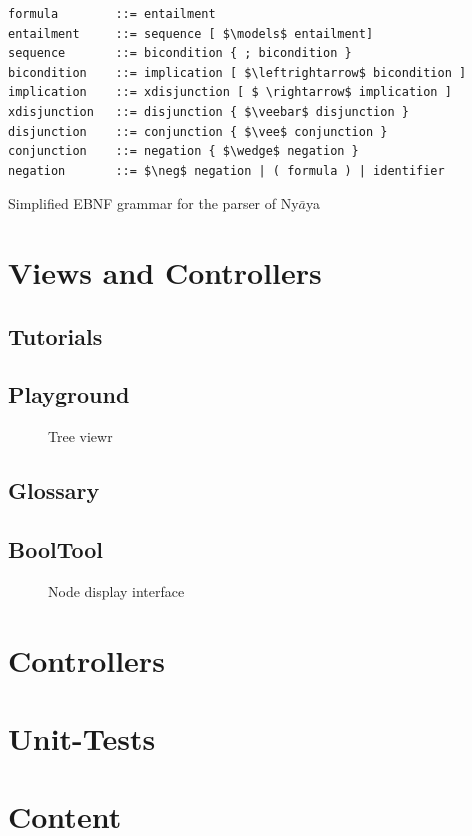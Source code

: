 \begin{table}[htdp]
\begin{center}
\begin{lstlisting}[mathescape]
formula        ::= entailment
entailment     ::= sequence [ $\models$ entailment]
sequence       ::= bicondition { ; bicondition } 
bicondition    ::= implication [ $\leftrightarrow$ bicondition ]
implication    ::= xdisjunction [ $ \rightarrow$ implication ]
xdisjunction   ::= disjunction { $\veebar$ disjunction }
disjunction    ::= conjunction { $\vee$ conjunction }
conjunction    ::= negation { $\wedge$ negation }
negation       ::= $\neg$ negation | ( formula ) | identifier
\end{lstlisting}
\caption{Simplified EBNF grammar for the parser of Ny$\bar{a}$ya}
\label{tab:EBNF}
\end{center}
\end{table}


\section{Views and Controllers}

\subsection{Tutorials}

\subsection{Playground}

\begin{figure}[htbp]
\begin{center}
\caption{Tree viewr}
\label{fig:TreeView}
\end{center}
\end{figure}

\subsection{Glossary}

\subsection{BoolTool}




\begin{figure}[htbp]
\begin{center}
\caption{Node display interface}
\label{fig:NyayaNodeDisplay}
\end{center}
\end{figure}

\section{Controllers}








\section{Unit-Tests}

\section{Content}



